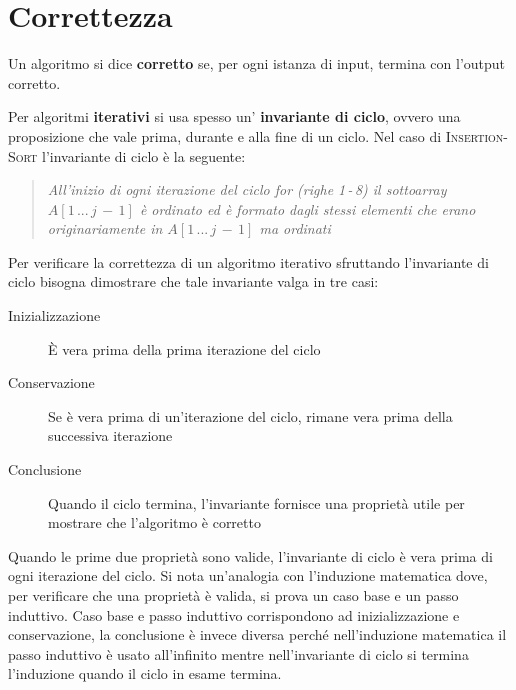 \documentclass[10pt, a4paper]{report}
\begin{document}
\section{Correttezza}
Un algoritmo si dice \textbf{corretto} se, per ogni istanza di input, termina con l'output corretto.

Per algoritmi \textbf{iterativi} si usa spesso un' \textbf{invariante di ciclo}, ovvero una proposizione che vale prima, durante e alla fine di un ciclo. Nel caso di \textsc{Insertion-Sort} l'invariante di ciclo è la seguente:
\begin{quote}
\textit{All'inizio di ogni iterazione del ciclo for (righe 1\,-\,8)  il sottoarray $A[1\,...\,j\,-\,1]$ è ordinato ed è formato dagli stessi elementi che erano originariamente in $A[1\,...\,j\,-\,1]$  ma ordinati}
\end{quote}
Per verificare la correttezza di un algoritmo iterativo sfruttando l'invariante di ciclo bisogna dimostrare che tale invariante valga in tre casi:
\begin{description}
\item[Inizializzazione]È vera prima della prima iterazione del ciclo
\item[Conservazione]Se è vera prima di un'iterazione del ciclo, rimane vera prima della successiva iterazione
\item[Conclusione]Quando il ciclo termina, l'invariante fornisce una proprietà utile per mostrare che l'algoritmo è corretto
\end{description}
Quando le prime due proprietà sono valide, l'invariante di ciclo è vera prima di ogni iterazione del ciclo. Si nota un'analogia con l'induzione matematica dove, per verificare che una proprietà è valida, si prova un caso base e un passo induttivo. Caso base e passo induttivo corrispondono ad inizializzazione e conservazione, la conclusione è invece diversa perché nell'induzione matematica il passo induttivo è usato all'infinito mentre nell'invariante di ciclo si termina l'induzione quando il ciclo in esame termina.
\end{document}
